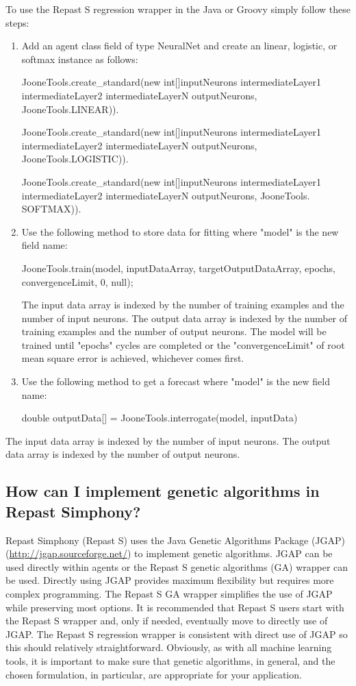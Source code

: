 \documentclass[11pt]{article}
\begin{document}
To use the Repast S regression wrapper in the Java or Groovy simply follow these steps:
\begin{enumerate}
\item Add an agent class field of type NeuralNet and create an linear, logistic, or softmax instance as follows:

JooneTools.create\_standard(new int[]{inputNeurons intermediateLayer1 intermediateLayer2 intermediateLayerN outputNeurons}, JooneTools.LINEAR)).

JooneTools.create\_standard(new int[]{inputNeurons intermediateLayer1 intermediateLayer2 intermediateLayerN outputNeurons}, JooneTools.LOGISTIC)).

JooneTools.create\_standard(new int[]{inputNeurons intermediateLayer1 intermediateLayer2 intermediateLayerN outputNeurons}, JooneTools. SOFTMAX)).

\item Use the following method to store data for fitting where "model" is the new field name:

JooneTools.train(model, inputDataArray, targetOutputDataArray, epochs, convergenceLimit, 0, null);

The input data array is indexed by the number of training examples and the number of input neurons. The output data array is indexed by the number of training examples and the number of output neurons. The model will be trained until "epochs" cycles are completed or the "convergenceLimit" of root mean square error is achieved, whichever comes first.
\item Use the following method to get a forecast where "model" is the new field name:

double outputData[] = JooneTools.interrogate(model, inputData)
\end{enumerate}

The input data array is indexed by the number of input neurons. The output data array is indexed by the number of output neurons.

\subsection{How can I implement genetic algorithms in Repast Simphony?}
\label{prs:genetic}

Repast Simphony (Repast S) uses the Java Genetic Algorithms Package (JGAP) (\url{http://jgap.sourceforge.net/}) to implement genetic algorithms. JGAP can be used directly within agents or the Repast S genetic algorithms (GA) wrapper can be used. Directly using JGAP provides maximum flexibility but requires more complex programming. The Repast S GA wrapper simplifies the use of JGAP while preserving most options. It is recommended that Repast S users start with the Repast S wrapper and, only if needed, eventually move to directly use of JGAP. The Repast S regression wrapper is consistent with direct use of JGAP so this should relatively straightforward. Obviously, as with all machine learning tools, it is important to make sure that genetic algorithms, in general, and the chosen formulation, in particular, are appropriate for your application.
\end{document}
